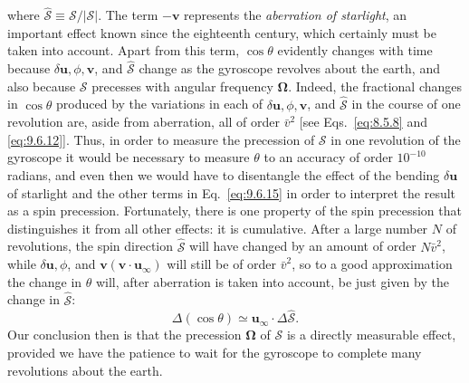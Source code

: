 where
\(\widehat{\boldsymbol{\mathcal S}}
\equiv\boldsymbol{\mathcal S}/|\boldsymbol{\mathcal S}|\).
The term \(-\mathbf v\) represents the \emph{aberration of starlight}, an
important effect known since the eighteenth century, which certainly must
be taken into account. Apart from this term, \(\cos\theta\) evidently
changes with time because \(\delta\mathbf u,\phi,\mathbf v\), and
\(\widehat{\boldsymbol{\mathcal S}}\) change as the gyroscope revolves
about the earth, and also because \(\boldsymbol{\mathcal S}\) precesses
with angular frequency \(\boldsymbol\Omega\). Indeed, the fractional
changes in \(\cos\theta\) produced by the variations in each of
\(\delta\mathbf u,\phi,\mathbf v\), and
\(\widehat{\boldsymbol{\mathcal S}}\) in the course of one revolution are,
aside from aberration, all of order \(\bar v^2\) [see
Eqs.~\eqref{eq:8.5.8} and \eqref{eq:9.6.12}]. Thus, in order to measure
the precession of \(\boldsymbol{\mathcal S}\) in one revolution of the
gyroscope it would be necessary to measure \(\theta\) to an accuracy of
order \(10^{-10}\) radians, and even then we would have to disentangle the
effect of the bending \(\delta\mathbf u\) of starlight and the other terms
in Eq.~\eqref{eq:9.6.15} in order to interpret the result as a spin
precession. Fortunately, there is one property of the spin precession that
distinguishes it from all other effects: it is cumulative. After a large
number \(N\) of revolutions, the spin direction
\(\widehat{\boldsymbol{\mathcal S}}\) will have changed by an amount of
order \(N\bar v^2\), while \(\delta\mathbf u,\phi\), and
\(\mathbf v(\mathbf v\cdot\mathbf u_\infty)\) will still be of order
\(\bar v^2\), so to a good approximation the change in \(\theta\) will,
after aberration is taken into account, be just given by the change in
\(\widehat{\boldsymbol{\mathcal S}}\):
\begin{equation}
  \Delta(\cos\theta)
  \simeq
  \mathbf u_\infty\cdot
  \Delta\widehat{\boldsymbol{\mathcal S}}.
  \tag{9.6.16}\label{eq:9.6.16}
\end{equation}
Our conclusion then is that the precession \(\boldsymbol\Omega\) of
\(\boldsymbol{\mathcal S}\) is a directly measurable effect, provided we
have the patience to wait for the gyroscope to complete many revolutions
about the earth.

